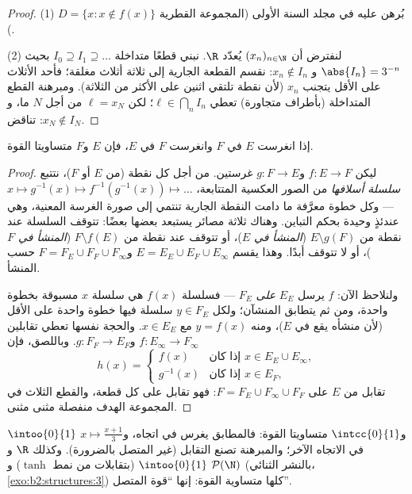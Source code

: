 \begin{proof}
(1) بُرهن عليه في مجلد السنة الأولى (المجموعة القطرية $D = \{x : x
\notin f(x)\}$).

(2) لنفترض أن $(x_n)_{n \in \N}$ يُعدّد $\R$. نبني قطعًا متداخلة
$I_0 \supseteq I_1 \supseteq \dots$ بحيث $\abs{I_n} = 3^{-n}$ و
$x_n \notin I_n$: نقسم القطعة الجارية إلى ثلاثة أثلاث مغلقة؛
فأحد الأثلاث على الأقل يتجنب $x_n$ (لأن نقطة تلتقي اثنين على الأكثر
من الثلاثة). ومبرهنة القطع المتداخلة (بأطراف متجاورة) تعطي
$\ell \in \bigcap_n I_n$؛ لكن $\ell = x_N$ من أجل $N$ ما، و$x_N
\notin I_N$: تناقض.
\end{proof}

\begin{theorem}\label{thm:b2:structures:cantorbernstein}
إذا انغرست $E$ في $F$ وانغرست $F$ في $E$، فإن $E$ و$F$
متساويتا القوة.
\end{theorem}

\begin{proof}
ليكن $f \colon E \to F$ و$g \colon F \to E$ غرستين. من أجل كل نقطة (من $E$ أو $F$)،
نتتبع \emph{سلسلة أسلافها} من الصور العكسية المتتابعة،
$x \mapsto g^{-1}(x) \mapsto
f^{-1}(g^{-1}(x)) \mapsto \dots$ --- وكل خطوة معرَّفة ما دامت النقطة الجارية تنتمي إلى صورة
الغرسة المعنية، وهي عندئذٍ وحيدة بحكم التباين. وهناك ثلاثة مصائر
يستبعد بعضها بعضًا: تتوقف السلسلة عند نقطة من $E \setminus g(F)$ (\emph{المنشأ في
$E$})، أو تتوقف عند نقطة من $F \setminus f(E)$ (\emph{المنشأ في
$F$})، أو لا تتوقف أبدًا. وهذا يقسم $E = E_E \cup E_F \cup
E_\infty$ و$F = F_E \cup F_F \cup F_\infty$ حسب
المنشأ.

ولنلاحظ الآن: $f$ يرسل $E_E$ \emph{على} $F_E$ --- فسلسلة
$f(x)$ هي سلسلة $x$ مسبوقة بخطوة واحدة، ومن ثم يتطابق المنشآن؛
ولكل $y \in F_E$ سلسلة فيها خطوة واحدة على الأقل (لأن منشأه
يقع في $E$)، ومنه $y = f(x)$ مع $x \in E_E$. والحجة نفسها
تعطي تقابلين $f \colon E_\infty \to F_\infty$ و$g \colon F_F
\to E_F$. وباللصق، فإن
\[
h(x) =
\begin{cases}
f(x) & \text{إذا كان } x \in E_E \cup E_\infty,\\
g^{-1}(x) & \text{إذا كان } x \in E_F,
\end{cases}
\]
تقابل من $E$ على $F = F_E \cup F_\infty \cup F_F$: فهو تقابل على كل قطعة،
والقطع الثلاث في المجموعة الهدف منفصلة مثنى مثنى.
\end{proof}

\begin{example}\label{ex:b2:structures:cbexample}
$\intoo{0}{1}$ و$\intcc{0}{1}$ متساويتا القوة: فالمطابق
يغرس في اتجاه، و$x \mapsto \frac{x + 1}{3}$ في الاتجاه الآخر؛ والمبرهنة
تصنع التقابل (غير المتصل بالضرورة). وكذلك
$\R$ و$\intoo{0}{1}$ (بتقابلات من نمط $\tanh$) و
$\mathcal{P}(\N)$ (بالنشر الثنائي، \cref{exo:b2:structures:3})
كلها متساوية القوة: إنها ``قوة المتصل''.
\end{example}

